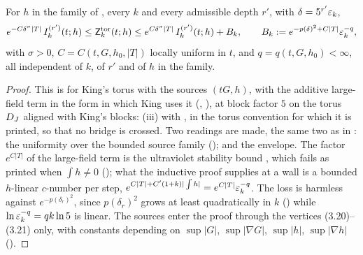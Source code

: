 \begin{proposition}\label{rot:prop:H6S1}
For $h$ in the family of , every $k$ and every admissible depth $r'$, with $\delta=5^{r'}\varepsilon_k$,
\[
e^{-C\delta^\sigma|T|}\,I^{(r')}_k(t;h)\le\mathsf Z^{\rm tor}_k(t;h)\le e^{C\delta^\sigma|T|}\,I^{(r')}_k(t;h)+B_k,\qquad B_k:= e^{-p(\delta)^2+C|T|}\varepsilon_k^{-q},
\]
with $\sigma>0$, $C=C(t,G,h_0,|T|)$ locally uniform in $t$, and $q=q(t,G,h_0)<\infty$, all independent of $k$, of $r'$ and of $h$ in the family.
\end{proposition}
\begin{proof}
This is \cite[Thm.~3.1, (3.3)--(3.4)]{K1} for King's torus with the sources $(tG,h)$, with the additive large-field term in the form in which King uses it (\cite[(3.11)]{K1}, \cite[(4.7)]{K2}), at block factor $5$ on the torus $D_J$ aligned with King's blocks: (iii) with , in the torus convention for which it is printed, so that no bridge is crossed. Two readings are made, the same two as in : the uniformity over the bounded source family (); and the envelope. The factor $e^{C|T|}$ of the large-field term is the ultraviolet stability bound \cite[(2.23)]{K1}, which fails as printed when $\int h\ne0$ (); what the inductive proof supplies at a wall is a bounded $h$-linear $c$-number per step, $e^{C|T|+C'(1+k)|\int h|}=e^{C|T|}\varepsilon_k^{-q}$. The loss is harmless against $e^{-p(\delta_r)^2}$, since $p(\delta_r)^2$ grows at least quadratically in $k$ () while $\ln\varepsilon_k^{-q}=qk\ln5$ is linear. The sources enter the proof through the vertices (3.20)--(3.21) only, with constants depending on $\sup|G|$, $\sup|\nabla G|$, $\sup|h|$, $\sup|\nabla h|$ (\cite[pp.~664--665, 677]{K1}).
\end{proof}

